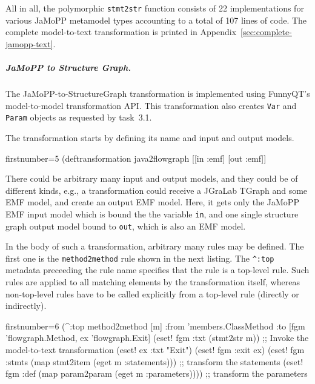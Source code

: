 \documentclass[submission]{eptcs}
\begin{document}
All in all, the polymorphic \verb|stmt2str| function consists of 22
implementations for various JaMoPP metamodel types accounting to a total of 107
lines of code.  The complete model-to-text transformation is printed in
Appendix~\ref{sec:complete-jamopp-text}.


\subparagraph{JaMoPP to Structure Graph.}
\label{sec:jamopp-struct-graph}

The JaMoPP-to-StructureGraph transformation is implemented using FunnyQT's
model-to-model transformation API.  This transformation also creates \verb|Var|
and \verb|Param| objects as requested by task~3.1.

The transformation starts by defining its name and input and output models.

\begin{clojurecode*}{firstnumber=5}
(deftransformation java2flowgraph [[in :emf] [out :emf]]
\end{clojurecode*}

There could be arbitrary many input and output models, and they could be of
different kinds, e.g., a transformation could receive a JGraLab TGraph and some
EMF model, and create an output EMF model.  Here, it gets only the JaMoPP EMF
input model which is bound the the variable \verb|in|, and one single structure
graph output model bound to \verb|out|, which is also an EMF model.

In the body of such a transformation, arbitrary many rules may be defined.  The
first one is the \verb|method2method| rule shown in the next listing.  The
\verb|^:top| metadata preceeding the rule name specifies that the rule is a
top-level rule.  Such rules are applied to all matching elements by the
transformation itself, whereas non-top-level rules have to be called explicitly
from a top-level rule (directly or indirectly).

\begin{clojurecode*}{firstnumber=6}
  (^:top method2method [m]
         :from 'members.ClassMethod
         :to [fgm 'flowgraph.Method, ex 'flowgraph.Exit]
         (eset! fgm :txt (stmt2str m)) ;; Invoke the model-to-text transformation
         (eset! ex :txt "Exit")
         (eset! fgm :exit ex)
         (eset! fgm :stmts (map stmt2item (eget m :statements)))  ;; transform the statements
         (eset! fgm :def (map param2param (eget m :parameters)))) ;; transform the parameters
\end{clojurecode*}
\end{document}
